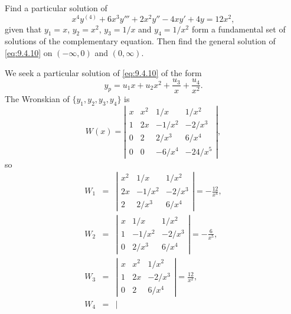 \begin{example}
  \label{example:9.4.2} \rm Find a particular solution of
  \begin{equation}
    \label{eq:9.4.10}x^{4}y^{(4)}+6x^{3}y'''+2x^{2}y''-4xy'+4y=12x^{2},
  \end{equation}
  given that $y_{1}=x$, $y_{2}=x^{2}$, $y_{3}=1/x$ and $y_{4}=1/x^{2}$ form a fundamental set of
  solutions of the complementary equation. Then find the general solution of \eqref{eq:9.4.10} on
  $(-\infty,0)$ and $(0,\infty)$.
\end{example}

\begin{examplesolution}
\solution We seek a particular solution of \eqref{eq:9.4.10} of the form
\[
  y_{p}=u_{1}x+u_{2}x^{2}+\frac{u_{3}}{x}+\frac{u_{4}}{x^{2}}.
\]
The Wronskian of $\{y_{1},y_{2},y_{3},y_{4}\}$ is
\[
  W(x)=\left|
  \begin{array}{cccr}
    x & x^{2} & 1/x      & 1/x^{2}   \\[5pt]
    1 & 2x    & -1/x^{2} & -2/x^{3}  \\[5pt]
    0 & 2     & 2/x^{3}  & 6/x^{4}   \\[5pt]
    0 & 0     & -6/x^{4} & -24/x^{5}
  \end{array}\right|,
\]
so
\begin{eqnarray*}
  W_{1}&=& \left|
  \begin{array}{ccr}
    x^{2} & 1/x      & 1/x^{2}  \\[5pt]
    2x    & -1/x^{2} & -2/x^{3} \\[5pt]
    2     & 2/x^{3}  & 6/x^{4}
  \end{array}\right|=-\frac{12}{x^{4}},\\[10pt] W_{2}&=& \left|
  \begin{array}{ccr}
    x & 1/x      & 1/x^{2}  \\[5pt]
    1 & -1/x^{2} & -2/x^{3} \\[5pt]
    0 & 2/x^{3}  & 6/x^{4}
  \end{array}\right|=-\frac{6}{x^{5}},\\[10pt] W_{3}&=& \left|
  \begin{array}{ccc}
    x & x^{2} & 1/x^{2}  \\[5pt]
    1 & 2x    & -2/x^{3} \\[5pt]
    0 & 2     & 6/x^{4}
  \end{array}\right|=\frac{12}{x^{2}},\\ W_{4}&=& \left|
  \begin{array}{ccc}

\end{array}
\end{eqnarray*}
\end{examplesolution}
